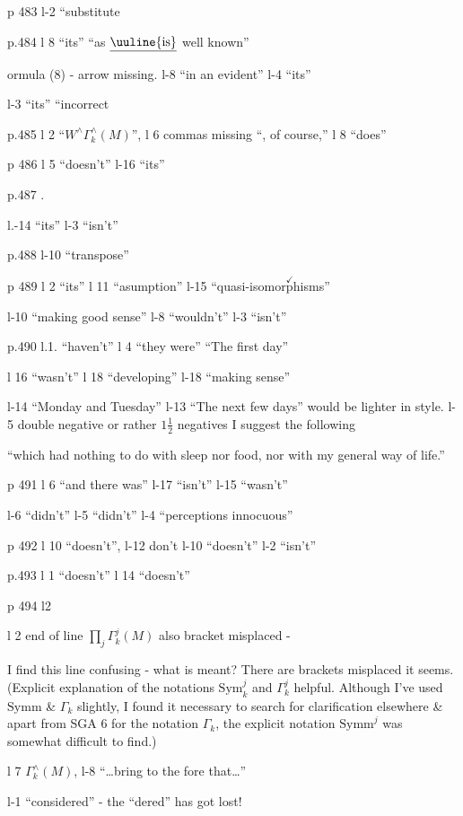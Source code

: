 
p 483 l-2 ``substitute

p.484 l 8 ``its'' \quad ``as $\underline{\text{\uuline{is}}}$ well known''

ormula (8) - arrow missing. \quad l-8 ``in an evident'' \quad l-4 ``its''

l-3 ``its'' \quad ``incorrect

p.485 l 2 ``$W^{\wedge}\Gamma_{k}^{\wedge}(M)$'', \quad l 6 commas missing ``, of course,'' \quad l 8 ``does''

p 486 l 5 ``doesn't'' \quad l-16 ``its''

p.487 .

l.-14 ``its'' \quad l-3 ``isn't''

p.488 l-10 ``transpose''

p 489 l 2 ``its'' \quad l 11 ``asumption'' \quad l-15 ``quasi-isomor$\overset{\checkmark}{\text{p}}$hisms''

l-10 ``making good sense'' \quad l-8 ``wouldn't'' \quad l-3 ``isn't''

p.490 l.1. ``haven't'' \quad l 4 ``they were'' \quad ``The first day''

l 16 ``wasn't'' \quad l 18 ``developing'' \quad l-18 ``making sense''

l-14 ``Monday and Tuesday'' \quad l-13 ``The next few days'' would be lighter in style. \quad l-5 double negative or rather $1\frac{1}{2}$ negatives I suggest the following

``which had nothing to do with sleep nor food, nor with my general way of life.''

p 491 l 6 ``and there was'' \quad l-17 ``isn't'' \quad l-15 ``wasn't''

l-6 ``didn't'' \quad l-5 ``didn't'' \quad l-4 ``perceptions innocuous''

p 492 l 10 ``doesn't'', \quad l-12 don't \quad l-10 ``doesn't'' \quad l-2 ``isn't''

p.493 l 1 ``doesn't'' \quad l 14 ``doesn't''

p 494 l2 

l 2 end of line $\prod\limits_{j}\Gamma_{k}^{j}(M)$ \quad also bracket misplaced -

\unsure{---} I find this line confusing - what is meant? There are brackets misplaced it seems. (Explicit explanation of the notations $\mathrm{Sym}_{k}^{j}$ and $\Gamma_{k}^{j}$   helpful. Although I've used $\mathrm{Symm}$ \& $\Gamma_{k}$\unsure{\deleted{,}|;|,} slightly, I  found  it necessary to search for clarification elsewhere \& apart from SGA 6 for the notation $\Gamma_{k}$, the explicit notation  $\mathrm{Symm}^{j}$ was somewhat difficult to find.)

l 7 $\Gamma_{k}^{\wedge}(M)$, \quad l-8 ``\ldots{}bring to the fore that\ldots''

l-1 ``considered'' - the ``dered'' has got lost!
